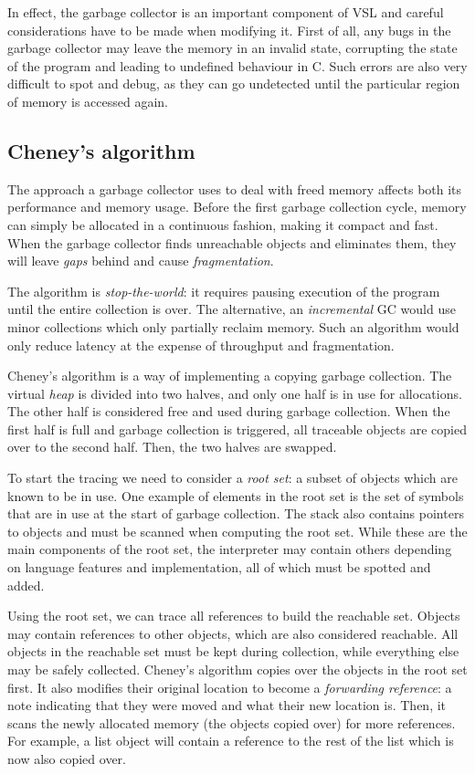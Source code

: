 In effect, the garbage collector is an important component of VSL and careful considerations
have to be made when modifying it. First of all, any bugs in the garbage collector may leave the memory in
an invalid state, corrupting the state of the program and leading to undefined behaviour in C. Such errors
are also very difficult to spot and debug, as they can go undetected until the particular region of memory
is accessed again.

\subsection{Cheney's algorithm}
The approach a garbage collector uses to deal with freed memory affects both its performance and memory usage.
Before the first garbage collection cycle, memory can simply be allocated in a continuous fashion, making it
compact and fast. When the garbage collector finds unreachable objects and eliminates them, they will leave
\emph{gaps} behind and cause \emph{fragmentation}.

The algorithm is \emph{stop-the-world}:
it requires pausing execution of the program until the entire collection is over.
The alternative, an \emph{incremental} GC would use minor collections which only partially reclaim memory.
Such an algorithm would only reduce latency at the expense of throughput and fragmentation.

Cheney's algorithm \cite{cheney} is a way of implementing a copying garbage collection.
The virtual \emph{heap} is divided into
two halves, and only one half is in use for allocations. The other half is considered free and used during garbage
collection. When the first half is full and garbage collection is triggered, all traceable objects are copied over
to the second half. Then, the two halves are swapped.

To start the tracing we need to consider a \emph{root set}: a subset of objects which are known to be in use.
One example of elements in the root set is the set of symbols that are in use at the start of garbage collection.
The stack also contains pointers to objects and must be scanned when computing the root set.
While these are the main components of the root set, the interpreter may contain others depending on language features
and implementation, all of which must be spotted and added.

Using the root set, we can trace all references to build the reachable set. Objects may contain references
to other objects, which are also considered reachable.
All objects in the reachable set must be kept during collection, while everything else may be safely collected.
Cheney's algorithm copies over the objects in the root set first. It also modifies their original location to become
a \emph{forwarding reference}: a note indicating that they were moved and what their new location is. Then, it scans
the newly allocated memory (the objects copied over) for more references.
For example, a list object will contain a reference to the rest of the list which is now also copied over.

